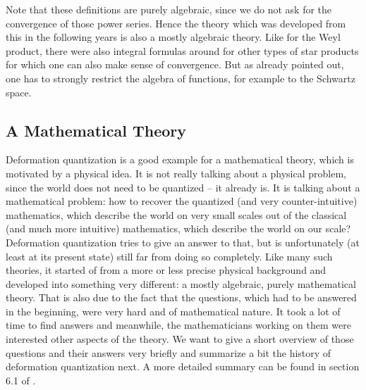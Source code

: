 Note that these definitions are purely algebraic, since we do not ask for the
convergence of those power series. Hence the theory which was developed from 
this in the following years is also a mostly algebraic theory. Like for the Weyl 
product, there were also integral formulas around for other types of star products 
for which one can also make sense of convergence. But as already pointed out, one 
has to strongly restrict the algebra of functions, for example to the Schwartz 
space.



\subsection{A Mathematical Theory}
\label{subsec:chap2_MathTheory}
Deformation quantization is a good example for a mathematical theory, which is 
motivated by a physical idea. It is not really talking about a physical problem, 
since the world does not need to be quantized -- it already is. It is talking 
about a mathematical problem: how to recover the quantized (and very 
counter-intuitive) mathematics, which describe the world on very small scales out 
of the classical (and much more intuitive) mathematics, which describe the world 
on our scale? Deformation quantization tries to give an answer to that, but is 
unfortunately (at least at its present state) still far from doing so completely. 
Like many such theories, it started of from a more or less precise physical 
background and developed into something very different: a mostly algebraic, purely 
mathematical theory. That is also due to the fact that the questions, which had to 
be answered in the beginning, were very hard and of mathematical nature. It took a 
lot of time to find answers and meanwhile, the mathematicians working on them
were interested other aspects of the theory. We want to give a short overview of
those questions and their answers very briefly and summarize a bit the history of 
deformation quantization next. A more detailed summary can be found in section 6.1 
of \cite{waldmann:2007a}.


